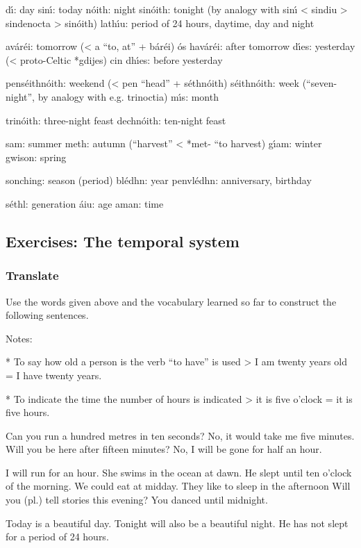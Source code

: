 d\'{\i}: day
sin\'{\i}: today
n\'{o}ith: night
sin\'{o}ith: tonight (by analogy with sin\'{\i} < sindiu > sindenocta > sin\'{o}ith)
lath\'{\i}u: period of 24 hours, daytime, day and night

av\'{a}r\'{e}i: tomorrow (< a “to, at” + b\'{a}r\'{e}i)
\'{o}s hav\'{a}r\'{e}i: after tomorrow
d\'{\i}es: yesterday (< proto-Celtic *gdijes)
cin dh\'{\i}es: before yesterday

pens\'{e}ithn\'{o}ith: weekend (< pen “head” + s\'{e}thn\'{o}ith)
s\'{e}ithn\'{o}ith: week (“seven-night”, by analogy with e.g. trinoctia)
m\'{\i}s: month

trin\'{o}ith: three-night feast
dechn\'{o}ith: ten-night feast

sam: summer
meth: autumn (“harvest” < *met- “to harvest)
g\'{\i}am: winter
gwison: spring

sonching: season (period)
bl\'{e}dhn: year
penvl\'{e}dhn: anniversary, birthday

s\'{e}thl: generation
\'{a}iu: age
aman: time

\subsection{Exercises: The temporal system}

\subsubsection{Translate}

Use the words given above and the vocabulary learned so far to construct the following sentences.

Notes: 

* To say how old a person is the verb “to have” is used > I am twenty years old = I have twenty years. 

* To indicate the time the number of hours is indicated > it is five o’clock = it is five hours.

Can you run a hundred metres in ten seconds?
No, it would take me five minutes.
Will you be here after fifteen minutes?
No, I will be gone for half an hour.

I will run for an hour.
She swims in the ocean at dawn.
He slept until ten o’clock of the morning.
We could eat at midday.
They like to sleep in the afternoon
Will you (pl.) tell stories this evening?
You danced until midnight.

Today is a beautiful day.
Tonight will also be a beautiful night.
He has not slept for a period of 24 hours.

